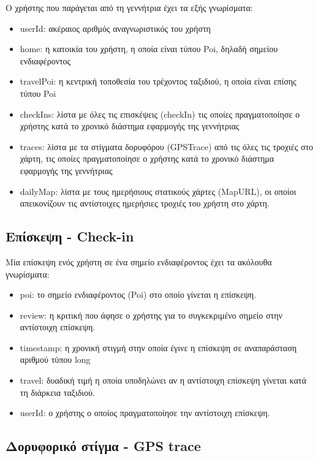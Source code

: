 Ο χρήστης που παράγεται από τη γεννήτρια έχει τα εξής γνωρίσματα:

\begin{itemize}
 \item userId: ακέραιος αριθμός αναγνωριστικός του χρήστη
 \item home: η κατοικία του χρήστη, η οποία είναι τύπου Poi, δηλαδή σημείου ενδιαφέροντος
 \item travelPoi: η κεντρική τοποθεσία του τρέχοντος ταξιδιού, η οποία είναι επίσης τύπου Poi
 \item checkIns: λίστα με όλες τις επισκέψεις (checkIn) τις οποίες πραγματοποίησε ο χρήστης κατά το χρονικό διάστημα εφαρμογής της γεννήτριας
 \item traces: λίστα με τα στίγματα δορυφόρου (GPSTrace) από τις όλες τις τροχιές στο χάρτη, τις οποίες πραγματοποίησε 
 ο χρήστης κατά το χρονικό διάστημα εφαρμογής της γεννήτριας
 \item dailyMap: λίστα με τους ημερήσιους στατικούς χάρτες (MapURL), οι οποίοι απεικονίζουν τις αντίστοιχες ημερήσιες τροχιές του χρήστη στο χάρτη.
\end{itemize}

\subsection{Επίσκεψη - Check-in}

Μία επίσκεψη ενός χρήστη σε ένα σημείο ενδιαφέροντος έχει τα ακόλουθα γνωρίσματα:

\begin{itemize}
 \item poi: το σημείο ενδιαφέροντος (Poi) στο οποίο γίνεται η επίσκεψη.
 \item review: η κριτική που άφησε ο χρήστης για το συγκεκριμένο σημείο στην αντίστοιχη επίσκεψη.
 \item timestamp: η χρονική στιγμή στην οποία έγινε η επίσκεψη σε αναπαράσταση αριθμού τύπου long
 \item travel: δυαδική τιμή η οποία υποδηλώνει αν η αντίστοιχη επίσκεψη γίνεται κατά τη διάρκεια ταξιδιού.
 \item userId: ο χρήστης ο οποίος πραγματοποίησε την αντίστοιχη επίσκεψη.
\end{itemize}

\subsection{Δορυφορικό στίγμα - GPS trace}

